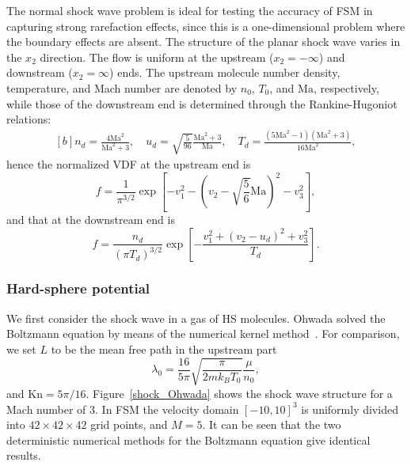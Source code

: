 The normal shock wave problem is ideal for testing the accuracy of FSM in capturing strong rarefaction effects, since this is a one-dimensional problem where the boundary effects are absent. The structure of the planar shock wave varies in the $x_2$ direction. The flow is uniform at the upstream ($x_2=-\infty$) and downstream ($x_2=\infty$) ends. The upstream molecule number density, temperature, and Mach number are denoted by $n_0$, $T_0$, and $\text{Ma}$, respectively, while those of the downstream end is determined through the Rankine-Hugoniot relations: 
\begin{equation*}%
\begin{aligned}[b]
n_d=\frac{4\text{Ma}^2}{\text{Ma}^2+3}, \quad
u_d=\sqrt{\frac{5}{96}}\frac{\text{Ma}^2+3}{\text{Ma}},\quad
T_d=\frac{(5\text{Ma}^2-1)(\text{Ma}^2+3)}{16\text{Ma}^2},
\end{aligned}
\end{equation*}
hence the normalized VDF at the upstream end is
\begin{equation}\label{shock_upstream}
    {f}=\frac{1}{{\pi}^{3/2}}\exp\left[-{v}_1^2-
    \left({v}_2-\sqrt{\frac{5}{6}}\text{Ma}\right)^2-{v}_3^2\right],
\end{equation}
and that at the downstream end is
\begin{equation}\label{down_upstream}
    {f}=\frac{n_d}{(\pi{T_d})^{3/2}}\exp\left[-\frac{{v}_1^2+
    ({v}_2-u_d)^2+{v}_3^2}{T_d}\right].
\end{equation}


\subsubsection{Hard-sphere potential}

We first consider the shock wave in a gas of HS molecules. Ohwada solved the Boltzmann equation by means of the numerical kernel method~\cite{Ohwada1993}. For comparison, 
we set $L$ to be the mean free path in the upstream part
\begin{equation}
\lambda_0=\frac{16}{5\pi}\sqrt{\frac{\pi}{2mk_BT_0}}
\frac{\mu}{n_0},
\end{equation} 
and $\text{Kn}=5\pi/16$. Figure~\ref{shock_Ohwada} shows the shock wave structure for a Mach number of 3. In FSM the velocity domain $[-10,10]^3$ is uniformly divided into $42\times42\times42$ grid points, and $M=5$. It can be seen that the two deterministic numerical methods for the Boltzmann equation give identical results.


